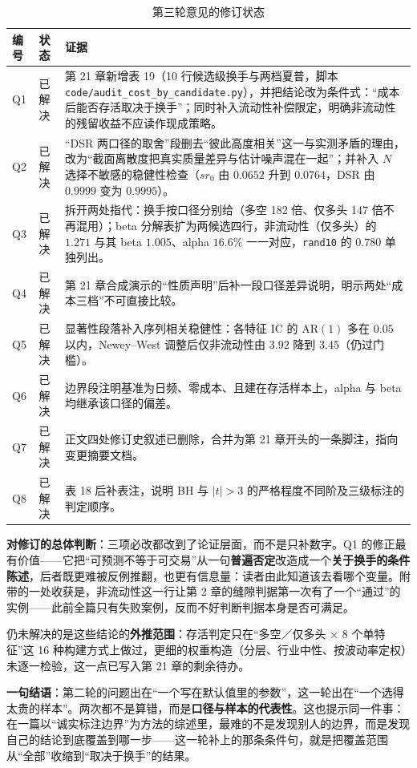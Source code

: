 \documentclass[11pt,a4paper]{ctexart}
\begin{document}
\begin{table}[htbp]
\centering
\caption{第三轮意见的修订状态}
\label{tab:status3}
\begin{tabular}{@{}>{\raggedright\arraybackslash}p{0.9cm}>{\raggedright\arraybackslash}p{1.2cm}>{\raggedright\arraybackslash}p{11.3cm}@{}}
\toprule
编号 & 状态 & 证据 \\
\midrule
Q1 & 已解决 & 第 21 章新增表 19（10 行候选级换手与两档夏普，脚本 \texttt{code/audit\_cost\_by\_candidate.py}），并把结论改为条件式：“成本后能否存活取决于换手”；同时补入流动性补偿限定，明确非流动性的残留收益不应读作现成策略。 \\
Q2 & 已解决 & “DSR 两口径的取舍”段删去“彼此高度相关”这一与实测矛盾的理由，改为“截面离散度把真实质量差异与估计噪声混在一起”；并补入 $N$ 选择不敏感的稳健性检查（$sr_0$ 由 $0.0652$ 升到 $0.0764$，DSR 由 $0.9999$ 变为 $0.9995$）。 \\
Q3 & 已解决 & 拆开两处指代：换手按口径分别给（多空 182 倍、仅多头 147 倍不再混用）；beta 分解表扩为两候选四行，非流动性（仅多头）的 $1.271$ 与其 beta $1.005$、alpha $16.6\%$ 一一对应，\texttt{rand10} 的 $0.780$ 单独列出。 \\
Q4 & 已解决 & 第 21 章合成演示的“性质声明”后补一段口径差异说明，明示两处“成本三档”不可直接比较。 \\
Q5 & 已解决 & 显著性段落补入序列相关稳健性：各特征 IC 的 $\text{AR}(1)$ 多在 $0.05$ 以内，Newey--West 调整后仅非流动性由 $3.92$ 降到 $3.45$（仍过门槛）。 \\
Q6 & 已解决 & 边界段注明基准为日频、零成本、且建在存活样本上，alpha 与 beta 均继承该口径的偏差。 \\
Q7 & 已解决 & 正文四处修订史叙述已删除，合并为第 21 章开头的一条脚注，指向变更摘要文档。 \\
Q8 & 已解决 & 表 18 后补表注，说明 BH 与 $|t|>3$ 的严格程度不同阶及三级标注的判定顺序。 \\
\bottomrule
\end{tabular}
\end{table}

\textbf{对修订的总体判断}：三项必改都改到了论证层面，而不是只补数字。Q1 的修正最有价值——它把“可预测不等于可交易”从一句\textbf{普遍否定}改造成一个\textbf{关于换手的条件陈述}，后者既更难被反例推翻，也更有信息量：读者由此知道该去看哪个变量。附带的一处收获是，非流动性这一行让第 2 章的缝隙判据第一次有了一个“通过”的实例——此前全篇只有失败案例，反而不好判断判据本身是否可满足。

仍未解决的是这些结论的\textbf{外推范围}：存活判定只在“多空／仅多头 × 8 个单特征”这 16 种构建方式上做过，更细的权重构造（分层、行业中性、按波动率定权）未逐一检验，这一点已写入第 21 章的剩余待办。

\medskip

\noindent\textbf{一句结语}：第二轮的问题出在“一个写在默认值里的参数”，这一轮出在“一个选得太贵的样本”。两次都不是算错，而是\textbf{口径与样本的代表性}。这也提示同一件事：在一篇以“诚实标注边界”为方法的综述里，最难的不是发现别人的边界，而是发现自己的结论到底覆盖到哪一步——这一轮补上的那条条件句，就是把覆盖范围从“全部”收缩到“取决于换手”的结果。
\end{document}
